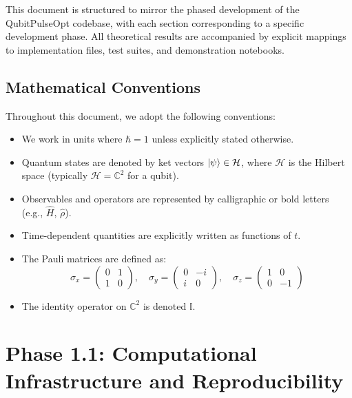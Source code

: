 \documentclass[11pt,a4paper]{article}
\theoremstyle{definition}
\theoremstyle{remark}
\newcommand{\paulix}{\sigma_x}
\newcommand{\pauliy}{\sigma_y}
\newcommand{\pauliz}{\sigma_z}
\newcommand{\identity}{\mathbb{I}}
\newcommand{\hilbert}{\mathcal{H}}
\newcommand{\CC}{\mathbb{C}}
\begin{document}
This document is structured to mirror the phased development of the QubitPulseOpt codebase, with each section corresponding to a specific development phase. All theoretical results are accompanied by explicit mappings to implementation files, test suites, and demonstration notebooks.

\subsection{Mathematical Conventions}

Throughout this document, we adopt the following conventions:

\begin{itemize}
    \item We work in units where $\hbar = 1$ unless explicitly stated otherwise.
    \item Quantum states are denoted by ket vectors $\ket{\psi} \in \hilbert$, where $\hilbert$ is the Hilbert space (typically $\hilbert = \CC^2$ for a qubit).
    \item Observables and operators are represented by calligraphic or bold letters (e.g., $\hat{H}$, $\hat{\rho}$).
    \item Time-dependent quantities are explicitly written as functions of $t$.
    \item The Pauli matrices are defined as:
    \begin{equation}
    \paulix = \begin{pmatrix} 0 & 1 \\ 1 & 0 \end{pmatrix}, \quad
    \pauliy = \begin{pmatrix} 0 & -i \\ i & 0 \end{pmatrix}, \quad
    \pauliz = \begin{pmatrix} 1 & 0 \\ 0 & -1 \end{pmatrix}
    \end{equation}
    \item The identity operator on $\CC^2$ is denoted $\identity$.
\end{itemize}

\section{Phase 1.1: Computational Infrastructure and Reproducibility}
\label{sec:phase1.1}
\end{document}
